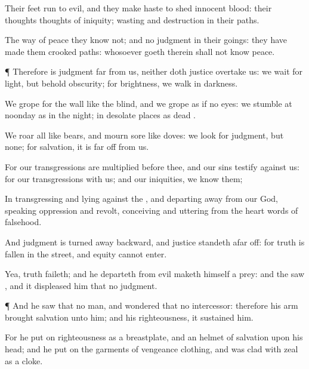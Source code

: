 {Their
feet
run to
evil, and they make
haste to
shed
innocent
blood: their
thoughts
{}
thoughts of
iniquity;
wasting and
destruction
{} in their
paths.

The
way of
peace they
know not; and
{} no
judgment in their
goings: they have made them
crooked
paths: whosoever
goeth therein shall not
know
peace.


\par }{\PP {}¶ Therefore is
judgment
far from us, neither doth
justice
overtake us: we
wait for
light, but behold
obscurity; for
brightness,
{} we
walk in
darkness.

We
grope for the
wall like the
blind, and we
grope as if
{} no
eyes: we
stumble at
noonday as in the
night;
{} in
desolate places as
dead
{}.

We
roar all like
bears, and
mourn
sore like
doves: we
look for
judgment, but
{} none; for
salvation,
{} it is far
off from us.

For our
transgressions are
multiplied before thee, and our
sins
testify against us: for our
transgressions
{} with us; and
{} our
iniquities, we
know them;

In
transgressing and
lying against the
{}, and departing
away
from our
God,
speaking
oppression and
revolt,
conceiving and
uttering from the
heart
words of
falsehood.

And
judgment is turned
away
backward, and
justice
standeth afar
off: for
truth is
fallen in the
street, and
equity
cannot
enter.

Yea,
truth
faileth; and he
{}
departeth from
evil maketh himself a
prey: and the
{}
saw
{}, and it
displeased him that
{} no
judgment.


\par }{\PP {}¶ And he
saw that
{} no
man, and
wondered that
{} no
intercessor: therefore his
arm brought
salvation unto him; and his
righteousness, it
sustained him.

For he put
on
righteousness as a
breastplate, and an
helmet of
salvation upon his
head; and he put
on the
garments of
vengeance
{}
clothing, and was
clad with
zeal as a
cloke.

}
